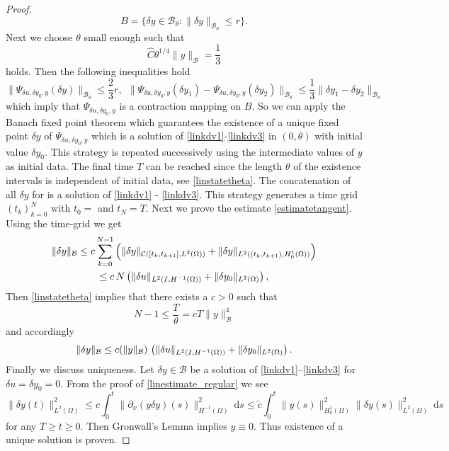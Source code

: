 \begin{proof}
{\[
B=\{\delta y \in \mathcal B_{\theta}\colon \|\delta y\|_{\mathcal B_{\theta}}\leq r\}.
\]
Next we choose $\theta$ small enough such that
\begin{equation}\label{linstatetheta}
\hat C\theta^{1/4}\|y\|_{\mathcal B}=\frac{1}{3}
\end{equation}
holds. Then the following inequalities hold
\[
\|\Psi_{\delta u, \delta y_0,y}(\delta y)\|_{\mathcal B_{\theta}}\leq \frac{2}{3}r,~~\|\Psi_{\delta u, \delta y_0,y}(\delta y_1) - \Psi_{\delta u, \delta y_0,y}(\delta y_2)\|_{\mathcal B_{\theta}}\leq\frac{1}{3}\|\delta y_1-\delta y_2\|_{\mathcal B_{\theta}}
\]
which imply that $\Psi_{\delta u, \delta y_0,y}$ is a contraction mapping on $B$. So we can apply the Banach fixed point theorem which guarantees the existence of a unique fixed point $\delta y$ of $\Psi_{\delta u, \delta y_0,y}$ which is a solution of \eqref{linkdv1}-\eqref{linkdv3} in $(0,\theta)$ with initial value $\delta y_0$. This strategy is repeated successively using the intermediate values of $y$ as initial data. The final time $T$ can be reached since the length $\theta$ of the existence intervals is independent of initial data, see \eqref{linstatetheta}. The concatenation of all $\delta y$ for is a solution of \eqref{linkdv1} - \eqref{linkdv3}. This strategy generates a time grid $(t_k)_{k=0}^N$ with $t_0=$ and $t_N=T$. Next we prove the estimate \eqref{estimatetangent}. Using the time-grid we get
\begin{multline*}
\|\delta y\|_{\mathcal B}\leq c\sum_{k=0}^{N-1}\left(\|\delta y\|_{\mathcal C([t_k,t_{k+1}],L^2(\Omega))}+\|\delta y\|_{L^2((t_k,t_{k+1}),H^1_0(\Omega))}\right)\\
\leq c\,N\left(\|\delta u\|_{\Hm1}+\|\delta y_0\|_{L^2(\Omega)}\right),
\end{multline*}
Then \eqref{linstatetheta} implies that there exists a $c>0$ such that
\[
N-1\leq\frac T\theta=cT\|y\|_{\mathcal B}^4
\]
and accordingly
\[
\|\delta y\|_{\mathcal B}\leq c(\|y\|_{\mathcal B})\,\left(\|\delta u\|_{\Hm1}+\|\delta y_0\|_{L^2(\Omega)}\right).
\]
Finally we discuss uniqueness. Let $\delta y\in \mathcal B$ be a solution of \eqref{linkdv1}--\eqref{linkdv3} for $\delta u=\delta y_0=0$. From the proof of \eqref{linestimate_regular} we see
\[
\|\delta y(t)\|_{L^2(\Omega)}^2\leq c\int_0^t\|\partial_x(y\delta y)(s)\|_{H^{-1}(\Omega)}^2~\mathrm ds\leq \tilde c\int_0^t\|y(s)\|_{H^1_0(\Omega)}^2\|\delta y(s)\|_{L^2(\Omega)}^2~\mathrm ds
\]
for any $T\geq t\geq 0$. Then Gronwall's Lemma implies $y\equiv0$. Thus existence of a unique solution is proven.}


\end{proof}
